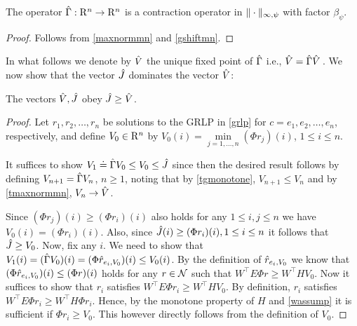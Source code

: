 \begin{comment}
\begin{theorem}\label{gmaxcontramn}
The operator $\Gamma  \colon \R^n\ra \R^n$ is a contraction operator in $\norm{\cdot}_{\mn}$ with factor $\beta_{\psi}$.
\end{theorem}
\end{comment}
\begin{theorem}\label{hgmaxcontramn}
The operator $\hat{\Gamma}:\mathrm{R}^n\to\mathrm{R}^n$  is a contraction operator in $\|\cdot\|_{\infty,\psi}$ with factor $\beta_{\psi}$.
\end{theorem}
\begin{proof}
Follows from \cref{maxnormmn} and \cref{gshiftmn}.
\begin{comment}
We already know that $\hg$ is monotone. That $\hg$ satisfies~\cref{eq:shiftmn}
with $\beta = \beta_{\psi}$ follows similarly to the argument used in  \cref{tgshift}
with modifications similar to those introduced in the proof of \cref{gshiftmn}.
Then, \cref{gmaxcontramn} gives the desired result.
\end{comment}
\end{proof}
In what follows we denote by $\hat{V}$ the unique fixed point of $\hat{\Gamma}$ i.e., $\hat{V} = \hat{\Gamma} \hat{V}\,$. We now show that the vector $\hat{J}$ dominates the vector $\hat{V}$:
\begin{lemma}\label{relation2}
The vectors $\hat{V},\hat{J}$ obey $\hat{J}\geq\hat{V}$.
\end{lemma}
\begin{proof}
Let $ r_1,  r_2,\ldots, r_n$ be solutions to the GRLP in \eqref{grlp} for $c=e_1, e_2,\ldots,e_n$, respectively,
and define $V_0\in \mathrm{R}^n$ by $V_0(i)=\underset{j=1,\ldots,n}{\min}(\Phi r_j)(i)$, $1\le i \le n$.

It suffices to show $V_1\doteq \hat{\Gamma} V_0 \le V_0 \le \hat{J}$ since then the desired result follows
by defining $V_{n+1} = \hat{\Gamma} V_n$, $n\ge 1$, noting that by \cref{tgmonotone}, $V_{n+1}\le V_{n}$ and by  \cref{tmaxnormmn}, $V_n \to \hat{V}$.

Since $(\Phi r_j)(i) \ge (\Phi r_i)(i)$ also holds for any $1\leq i,j\leq n$ we have $V_0(i)  = (\Phi r_i)(i)$. Also, since $\hat{J}(i) \ge (\Phi r_i)(i),1\leq i \leq n$ it follows that $\hat{J}\geq V_0$. 
Now,  fix any $i$. 
We need to show that $V_1(i)=(\hat{\Gamma} V_0)(i) = (\Phi \hat{r}_{e_i,V_0})(i) \leq V_0(i)$. 
By the definition of $\hat{r}_{e_i,V_0}$ we know that $(\Phi \hat{r}_{e_i,V_0})(i) \le (\Phi r)(i)$
holds for any $r\in \mathcal{N}$ such that $W^\top E \Phi r \ge W^\top H V_0$. 
Now it suffices to show that $r_i$ satisfies $W^\top E \Phi r_i \ge W^\top H V_0$. 
By definition, $r_i$ satisfies $W^\top E \Phi r_i \ge W^\top H \Phi r_i$.
Hence, by the monotone property of $H$ and \cref{wassump} it is sufficient if $\Phi r_i \ge V_0$.
This however directly follows from the definition of $V_0$.
\end{proof}
